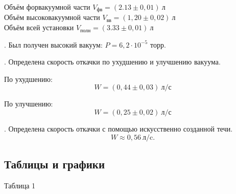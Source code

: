 \documentclass[a4paper,12pt]{article} %
\begin{document}
\medskip
 
\noindent Объём форвакуумной части $V_\text{фв} = (2.13\pm0,01)~\text{л}$\\
\noindent Объём высоковакуумной части $V_\text{вв} = (1,20\pm0,02)~\text{л}$\\
\noindent Объём всей установки $V_\text{полн} = (3.33\pm0,01)~\text{л}$\\

\medskip

. Был получен высокий вакуум: $P = 6,2 \cdot 10^{-5}$ торр.

\medskip

. Определена скорость откачки по ухудшению и улучшению вакуума.

\medskip	

\noindent По ухудшению:
	$$W = (0,44\pm0,03) ~\text{л/с}$$
	
\medskip	
	
\noindent По улучшению:
	$$W = (0,25\pm0,02) ~\text{л/с}$$

\medskip

. Определена скорость откачки с помощью искусственно созданной течи.  $$W \approx 0,56 ~\text{л/c}.$$

\medskip

\subsection*{Таблицы и графики}
\medskip

\begin{center}
Таблица 1
\end{center}
\end{document}

